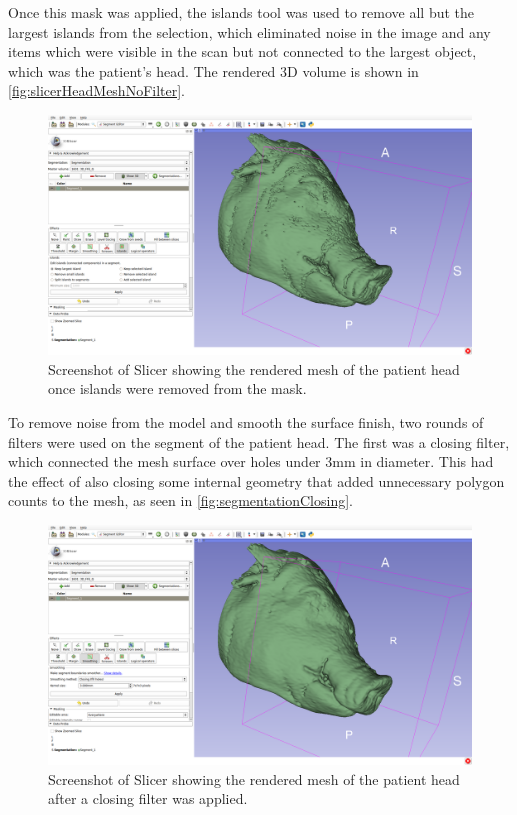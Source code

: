 \documentclass[12pt]{report}
\begin{document}
Once this mask was applied, the islands tool was used to remove all but the largest islands from the selection, which eliminated noise in the image and any items which were visible in the scan but not connected to the largest object, which was the patient's head. The rendered 3D volume is shown in \autoref{fig:slicerHeadMeshNoFilter}.

\begin{figure}[thpb]
	\centering
	\includegraphics[width=\textwidth]{images/segmentation_islands.png}
    \caption{Screenshot of Slicer showing the rendered mesh of the patient head once islands were removed from the mask.}
    \label{fig:slicerHeadMeshNoFilter}
\end{figure}

To remove noise from the model and smooth the surface finish, two rounds of filters were used on the segment of the patient head. The first was a closing filter, which connected the mesh surface over holes under 3mm in diameter. This had the effect of also closing some internal geometry that added unnecessary polygon counts to the mesh, as seen in \autoref{fig:segmentationClosing}.

\begin{figure}[thpb]
	\centering
	\includegraphics[width=\textwidth]{images/segmentation_closing.png}
    \caption{Screenshot of Slicer showing the rendered mesh of the patient head after a closing filter was applied.}
    \label{fig:segmentationClosing}
\end{figure}
\end{document}

